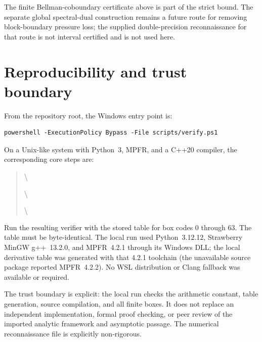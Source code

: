 \documentclass[11pt]{article}
\begin{document}
The finite Bellman-coboundary certificate above is part of the strict bound.
The separate global spectral-dual construction remains a future route for
removing block-boundary pressure loss; the supplied double-precision
reconnaissance for that route is not interval certified and is not used here.

\section{Reproducibility and trust boundary}
\label{sec:repro}
From the repository root, the Windows entry point is:
\begin{verbatim}
powershell -ExecutionPolicy Bypass -File scripts/verify.ps1
\end{verbatim}
On a Unix-like system with Python~3, MPFR, and a C++20 compiler, the
corresponding core steps are:
\begin{samepage}
\begin{quote}\small\ttfamily
{}\par
{} \textbackslash\par
\quad{}\par
{}\par
{} \textbackslash\par
\quad{}\par
{}\par
{} \textbackslash\par
\quad{}
\end{quote}
\end{samepage}
Run the resulting verifier with the stored table for box codes $0$ through
$63$.  The table must be byte-identical.  The local run used Python~3.12.12,
Strawberry MinGW g++~13.2.0, and MPFR~4.2.1 through its Windows DLL; the
local derivative table was generated with that 4.2.1 toolchain (the
unavailable source package reported MPFR~4.2.2).  No WSL distribution or
Clang fallback was available or required.

The trust boundary is explicit: the local run checks the arithmetic constant,
table generation, source compilation, and all finite boxes.  It does not
replace an independent implementation, formal proof checking, or peer review
of the imported analytic framework and asymptotic passage.  The numerical
reconnaissance file is explicitly non-rigorous.
\end{document}
